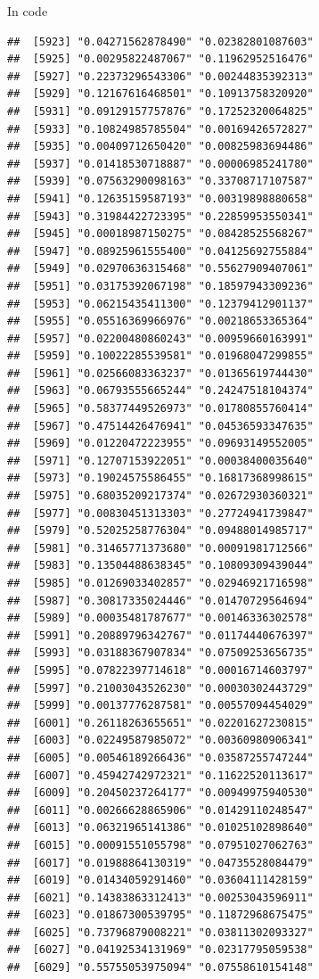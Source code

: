 \documentclass[ignorenonframetext,]{beamer}
\begin{document}
\begin{frame}[fragile]{In code}
\begin{verbatim}
##  [5923] "0.04271562878490" "0.02382801087603"
##  [5925] "0.00295822487067" "0.11962952516476"
##  [5927] "0.22373296543306" "0.00244835392313"
##  [5929] "0.12167616468501" "0.10913758320920"
##  [5931] "0.09129157757876" "0.17252320064825"
##  [5933] "0.10824985785504" "0.00169426572827"
##  [5935] "0.00409712650420" "0.00825983694486"
##  [5937] "0.01418530718887" "0.00006985241780"
##  [5939] "0.07563290098163" "0.33708717107587"
##  [5941] "0.12635159587193" "0.00319898880658"
##  [5943] "0.31984422723395" "0.22859953550341"
##  [5945] "0.00018987150275" "0.08428525568267"
##  [5947] "0.08925961555400" "0.04125692755884"
##  [5949] "0.02970636315468" "0.55627909407061"
##  [5951] "0.03175392067198" "0.18597943309236"
##  [5953] "0.06215435411300" "0.12379412901137"
##  [5955] "0.05516369966976" "0.00218653365364"
##  [5957] "0.02200480860243" "0.00959660163991"
##  [5959] "0.10022285539581" "0.01968047299855"
##  [5961] "0.02566083363237" "0.01365619744430"
##  [5963] "0.06793555665244" "0.24247518104374"
##  [5965] "0.58377449526973" "0.01780855760414"
##  [5967] "0.47514426476941" "0.04536593347635"
##  [5969] "0.01220472223955" "0.09693149552005"
##  [5971] "0.12707153922051" "0.00038400035640"
##  [5973] "0.19024575586455" "0.16817368998615"
##  [5975] "0.68035209217374" "0.02672930360321"
##  [5977] "0.00830451313303" "0.27724941739847"
##  [5979] "0.52025258776304" "0.09488014985717"
##  [5981] "0.31465771373680" "0.00091981712566"
##  [5983] "0.13504488638345" "0.10809309439044"
##  [5985] "0.01269033402857" "0.02946921716598"
##  [5987] "0.30817335024446" "0.01470729564694"
##  [5989] "0.00035481787677" "0.00146336302578"
##  [5991] "0.20889796342767" "0.01174440676397"
##  [5993] "0.03188367907834" "0.07509253656735"
##  [5995] "0.07822397714618" "0.00016714603797"
##  [5997] "0.21003043526230" "0.00030302443729"
##  [5999] "0.00137776287581" "0.00557094454029"
##  [6001] "0.26118263655651" "0.02201627230815"
##  [6003] "0.02249587985072" "0.00360980906341"
##  [6005] "0.00546189266436" "0.03587255747244"
##  [6007] "0.45942742972321" "0.11622520113617"
##  [6009] "0.20450237264177" "0.00949975940530"
##  [6011] "0.00266628865906" "0.01429110248547"
##  [6013] "0.06321965141386" "0.01025102898640"
##  [6015] "0.00091551055798" "0.07951027062763"
##  [6017] "0.01988864130319" "0.04735528084479"
##  [6019] "0.01434059291460" "0.03604111428159"
##  [6021] "0.14383863312413" "0.00253043596911"
##  [6023] "0.01867300539795" "0.11872968675475"
##  [6025] "0.73796879008221" "0.03811302093327"
##  [6027] "0.04192534131969" "0.02317795059538"
##  [6029] "0.55755053975094" "0.07558610154148"

\end{verbatim}
\end{frame}
\end{document}
